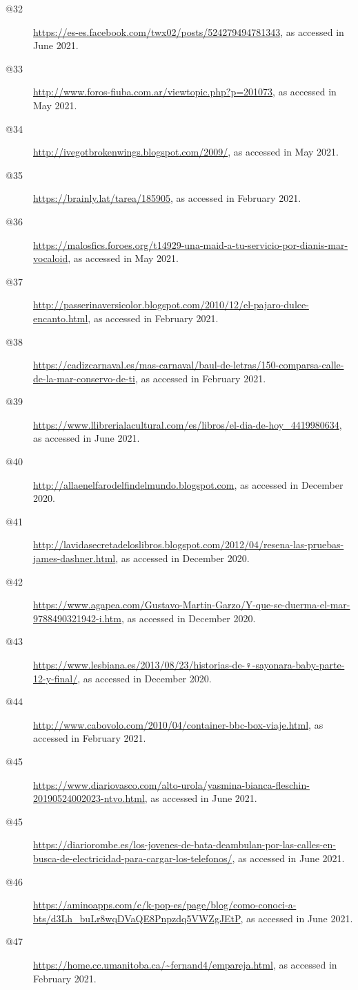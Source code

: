 \begin{flushleft}
\begin{description}
\item[@32] \url{https://es-es.facebook.com/twx02/posts/524279494781343}, as accessed in June 2021.
\item[@33] \url{http://www.foros-fiuba.com.ar/viewtopic.php?p=201073}{, as accessed in May 2021.}
\item[@34] \url{http://ivegotbrokenwings.blogspot.com/2009/}, as accessed in May 2021.
\item[@35] \url{https://brainly.lat/tarea/185905}, as accessed in February 2021.
\item[@36] \url{https://malosfics.foroes.org/t14929-una-maid-a-tu-servicio-por-dianis-mar-vocaloid}, as accessed in May 2021.
\item[@37] \url{http://passerinaversicolor.blogspot.com/2010/12/el-pajaro-dulce-encanto.html}, as accessed in February 2021.
\item[@38] \url{https://cadizcarnaval.es/mas-carnaval/baul-de-letras/150-comparsa-calle-de-la-mar-conservo-de-ti}, as accessed in February 2021.
\item[@39] \url{https://www.llibrerialacultural.com/es/libros/el-dia-de-hoy_4419980634}, as accessed in June 2021.
\item[@40] \url{http://allaenelfarodelfindelmundo.blogspot.com},  as accessed in December 2020.
\item[@41] \url{http://lavidasecretadeloslibros.blogspot.com/2012/04/resena-las-pruebas-james-dashner.html}, as accessed in December 2020.
\item[@42] \url{https://www.agapea.com/Gustavo-Martin-Garzo/Y-que-se-duerma-el-mar-9788490321942-i.htm}, as accessed in December 2020.
\item[@43] \url{https://www.lesbiana.es/2013/08/23/historias-de-♀-sayonara-baby-parte-12-y-final/}, as accessed in December 2020.
\item[@44] \url{http://www.cabovolo.com/2010/04/container-bbc-box-viaje.html}, as accessed in February 2021.
\item[@45] \url{https://www.diariovasco.com/alto-urola/yasmina-bianca-fleschin-20190524002023-ntvo.html}, as accessed in June 2021.
\item[@45] \url{https://diariorombe.es/los-jovenes-de-bata-deambulan-por-las-calles-en-busca-de-electricidad-para-cargar-los-telefonos/}, as accessed in June 2021.
\item[@46] \url{https://aminoapps.com/c/k-pop-es/page/blog/como-conoci-a-bts/d3Lh_buLr8wqDVaQE8Pnpzdq5VWZgJEtP}, as accessed in June 2021.
\item[@47] \url{https://home.cc.umanitoba.ca/~fernand4/empareja.html}, as accessed in February 2021.

\end{description}
\end{flushleft}
